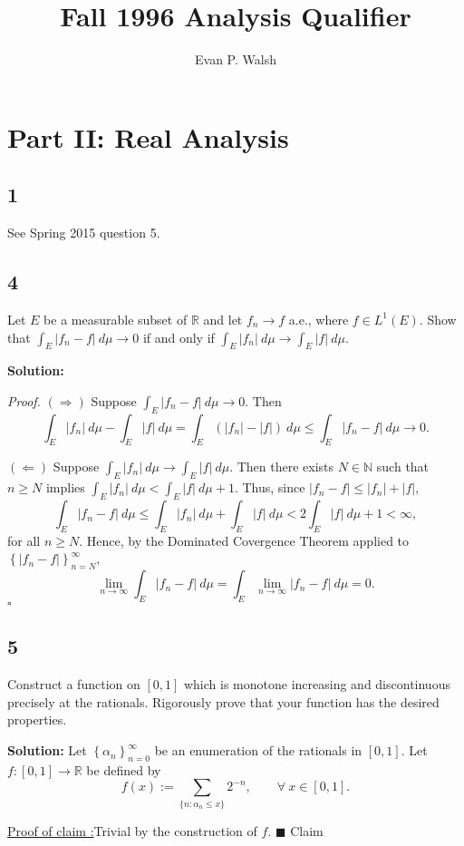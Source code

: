 \documentclass[12pt]{article}
\title{Fall 1996 Analysis Qualifier}
\author{Evan P. Walsh}
\newcounter{ProofCounter}
\newcounter{ClaimCounter}[ProofCounter]
\newenvironment{Proof}{\stepcounter{ProofCounter}\textit{Proof.}}{\hfill$\square$}
\newenvironment{claim}[1]{\vspace{3mm}\stepcounter{ClaimCounter}\par\noindent\underline{\bf Claim \theClaimCounter:}\space#1}{}
\newenvironment{claimproof}[1]{\par\noindent\underline{Proof of claim \theClaimCounter:}\space#1}{\hfill $\blacksquare$ Claim \theClaimCounter}
\begin{document}

\section*{Part II: Real Analysis}

\subsection*{1}
See Spring 2015 question 5.

\subsection*{4}
Let $E$ be a measurable subset of $\mathbb{R}$ and let $f_{n} \rightarrow f$ a.e., where $f \in L^{1}(E)$. Show that $\int_{E}|f_{n} - f|\ d\mu
\rightarrow 0$ if and only if $\int_{E}|f_{n}|\ d\mu \rightarrow \int_{E}|f|\ d\mu$.

{\bf Solution:}

\begin{Proof}
$(\Rightarrow)$ Suppose $\int_{E}|f_{n} - f|\ d\mu \rightarrow 0$. Then 
\[ \int_{E}|f_{n}|\ d\mu - \int_{E}|f|\ d\mu = \int_{E}(|f_{n}| - |f|)\ d\mu \leq \int_{E}|f_{n} - f| \ d\mu \rightarrow 0. \]

$(\Leftarrow)$ Suppose $\int_{E}|f_{n}|\ d\mu \rightarrow \int_{E}|f|\ d\mu$. Then there exists $N \in \mathbb{N}$ such that $n \geq N$ implies
$\int_{E}|f_{n}|\ d\mu < \int_{E}|f|\ d\mu + 1$.
Thus, since $|f_{n} - f| \leq |f_{n}| + |f|$,
\[ \int_{E}|f_{n} - f| \ d\mu \leq \int_{E}|f_{n}|\ d\mu + \int_{E}|f|\ d\mu < 2\int_{E}|f|\ d\mu + 1 < \infty, \]
for all $n \geq N$. Hence, by the Dominated Covergence Theorem applied to $\left\{ |f_{n} - f| \right\}_{n=N}^{\infty}$,
\[ \lim_{n\rightarrow\infty}\int_{E}|f_{n} - f| \ d\mu = \int_{E}\lim_{n\rightarrow\infty}|f_{n} - f|\ d\mu = 0. \]
\end{Proof}


\subsection*{5}
Construct a function on $[0,1]$ which is monotone increasing and discontinuous precisely at the rationals. Rigorously prove that your function has the
desired properties.

{\bf Solution:}
Let $\left\{ \alpha_{n} \right\}_{n=0}^{\infty}$ be an enumeration of the rationals in $[0,1]$. Let $f : [0,1] \rightarrow \mathbb{R}$ be defined by 
\[ f(x) := \sum_{\{n : \alpha_{n} \leq x \}}2^{-n}, \qquad \forall \ x \in [0,1]. \]
\begin{claimproof}
Trivial by the construction of $f$.
\end{claimproof}
\end{document}
